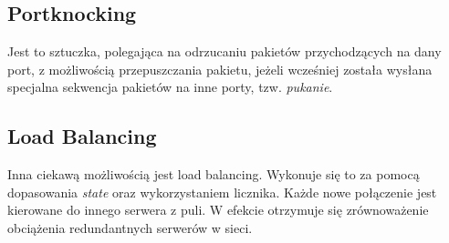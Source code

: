 \documentclass[a4paper,12pt]{article}
\begin{document}
\subsection{Portknocking}
Jest to sztuczka, polegająca na odrzucaniu pakietów przychodzących na dany port, z możliwością przepuszczania pakietu, jeżeli wcześniej została wysłana specjalna sekwencja pakietów na inne porty, tzw. \textit{pukanie}.
\subsection{Load Balancing}
Inna ciekawą możliwością jest load balancing. Wykonuje się to za pomocą dopasowania \textit{state} oraz wykorzystaniem licznika. Każde nowe połączenie jest kierowane do innego serwera z puli. W efekcie otrzymuje się zrównoważenie obciążenia redundantnych serwerów w sieci.
\end{document}
